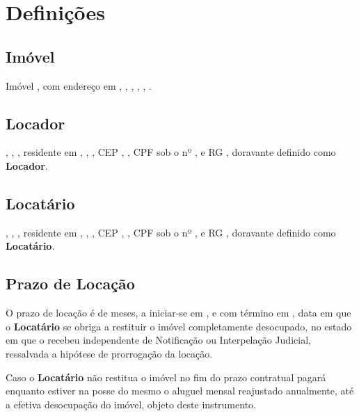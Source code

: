 \section{Definições}\label{sec:definitions}

\subsection{Imóvel}\label{sub-sec:building}

Imóvel \FinalidadeImovel, \tipoImovel  com endereço em \RuaImovel, \NumeroImovel, \complImovel, \CEPImovel, \CidadeImovel, \EstadoImovel. 



\subsection{Locador}\label{sub-sec:owner}

\nomelocador, \naturalidadeLocador, \ProfissaoLocador, residente em \RuaLocador, \NumeroLocador, \complLocador, CEP \CEPLocador, \EstadoLocador, CPF sob o nº \CPFLocador, e RG \RGLocador, doravante definido como \textbf{Locador}.


\subsection{Locatário}\label{sub-sec:renter}

\nomelocatario, \naturalidadeLocatario, \ProfissaoLocatario, residente em \RuaLocatario, \NumeroLocatario, \complLocatario, CEP \CEPLocatario, \EstadoLocatario , CPF sob o nº \CPFLocatario, e RG \RGLocatario, doravante definido como \textbf{Locatário}.




\subsection{Prazo de Locação}\label{sub-sec:timespam}


O prazo de locação é de \periodoDeLocacao meses, a iniciar-se em \iniciodocontrato, e com término em \fimdocontrato, data em que o \textbf{Locatário} se obriga a restituir o imóvel completamente desocupado, no estado em que o recebeu independente de Notificação ou Interpelação Judicial, ressalvada a hipótese de prorrogação da locação.

 Caso o \textbf{Locatário} não restitua o imóvel no fim do prazo contratual pagará enquanto estiver na posse do mesmo o aluguel mensal reajustado anualmente, até a efetiva desocupação do imóvel, objeto deste instrumento.


